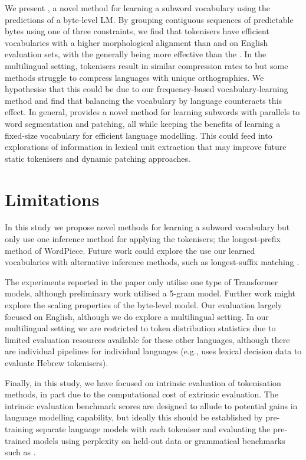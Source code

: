We present \tokname, a novel method for learning a subword vocabulary using the predictions of a byte-level LM. By grouping contiguous sequences of predictable bytes using one of three constraints, we find that \tokname tokenisers have efficient vocabularies with a higher morphological alignment than \bpe and \bpewp on English evaluation sets, with the  generally being more effective than the . In the multilingual setting, \tokname tokenisers result in similar compression rates to \bpe but some methods struggle to compress languages with unique orthographies. We hypothesise that this could be due to our frequency-based vocabulary-learning method and find that balancing the vocabulary by language counteracts this effect. In general, \tokname provides a novel method for learning subwords with parallels to word segmentation and patching, all while keeping the benefits of learning a fixed-size vocabulary for efficient language modelling. This could feed into explorations of information in lexical unit extraction that may improve future static tokenisers and dynamic patching approaches.

\section*{Limitations}

In this study we propose novel methods for learning a subword vocabulary but only use one inference method for applying the tokenisers; the longest-prefix method of WordPiece. Future work could explore the use our learned vocabularies with alternative inference methods, such as longest-suffix matching \citep{jacobs2022lost}.

The experiments reported in the paper only utilise one type of Transformer models, although preliminary work utilised a 5-gram model. Further work might explore the scaling properties of the byte-level model. Our evaluation largely focused on English, although we do explore a multilingual setting. In our multilingual setting we are restricted to token distribution statistics due to limited evaluation resources available for these other languages, although there are individual pipelines for individual languages (e.g., \citet{gazit2025splinteringnonconcatenativelanguagesbetter} uses lexical decision data to evaluate Hebrew tokenisers).

Finally, in this study, we have focused on intrinsic evaluation of tokenisation methods, in part due to the computational cost of extrinsic evaluation. The intrinsic evaluation benchmark scores are designed to allude to potential gains in language modelling capability, but ideally this should be established by pre-training separate language models with each tokeniser and evaluating the pre-trained models using perplexity on held-out data or grammatical benchmarks such as \blimp \citep{warstadt-etal-2020-blimp-benchmark}.

